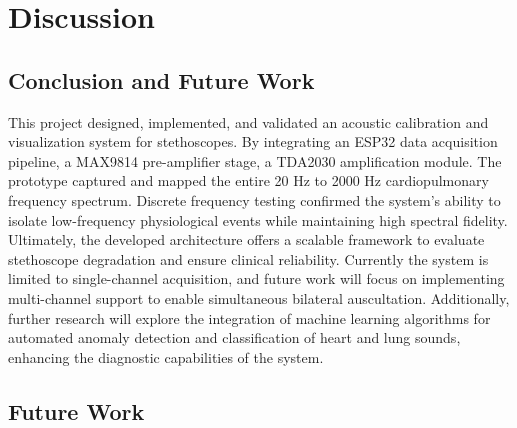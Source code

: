 
\chapter{Discussion} 	%
\label{Chapter6} 		%


\section{Conclusion and Future Work}

This project designed, implemented, and validated an acoustic calibration and visualization system for stethoscopes. By integrating an  ESP32 data acquisition pipeline, a MAX9814 pre-amplifier stage, a TDA2030 amplification module. The prototype captured and mapped the entire 20 Hz to 2000 Hz cardiopulmonary frequency spectrum. Discrete frequency testing confirmed the system's ability to isolate low-frequency physiological events while maintaining high spectral fidelity. Ultimately, the developed architecture offers a scalable framework to evaluate stethoscope degradation and ensure clinical reliability.
Currently the system is limited to single-channel acquisition, and future work will focus on implementing multi-channel support to enable simultaneous bilateral auscultation. Additionally, further research will explore the integration of machine learning algorithms for automated anomaly detection and classification of heart and lung sounds, enhancing the diagnostic capabilities of the system.

\section{Future Work}
\label{sec:Ch6.1}
    





